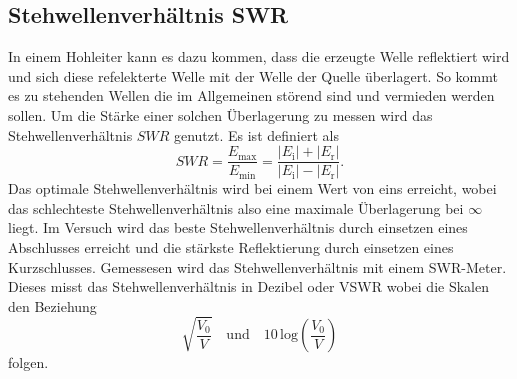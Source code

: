\subsection{Stehwellenverhältnis SWR}
In einem Hohleiter kann es dazu kommen, dass die erzeugte Welle reflektiert wird und sich diese refelekterte Welle mit der Welle der Quelle überlagert.
So kommt es zu stehenden Wellen die im Allgemeinen störend sind und vermieden werden sollen.
Um die Stärke einer solchen Überlagerung zu messen wird das Stehwellenverhältnis $SWR$ genutzt.
Es ist definiert als 
\begin{equation}
    SWR = \frac{E _\text{max}}{E _\text{min}} = \frac{\left | E _\text{i} \right | + \left | E _\text{r} \right |}{\left | E _\text{i} \right | - \left | E _\text{r} \right |}.
\end{equation}
Das optimale Stehwellenverhältnis wird bei einem Wert von eins erreicht, wobei das schlechteste Stehwellenverhältnis also eine maximale Überlagerung bei $ \infty $ liegt.
Im Versuch wird das beste Stehwellenverhältnis durch einsetzen eines Abschlusses erreicht und die stärkste Reflektierung durch einsetzen eines Kurzschlusses.
Gemessesen wird das Stehwellenverhältnis mit einem SWR-Meter.
Dieses misst das Stehwellenverhältnis in Dezibel oder VSWR wobei die Skalen den Beziehung
\begin{equation*}
    \sqrt{\frac{V_0}{V}}  \quad \text{und}  \quad 10 \, \text{log} \left ( \frac{V_0}{V}\right )  
\end{equation*}
folgen.

